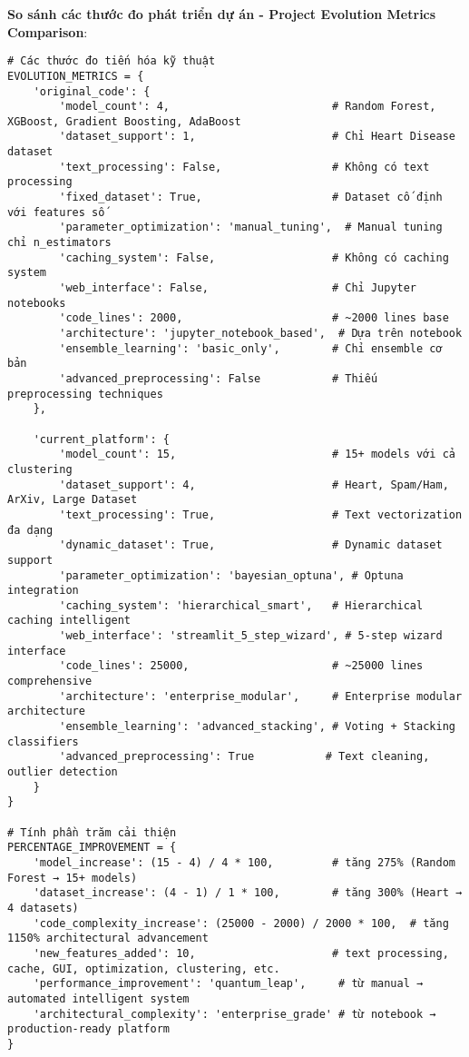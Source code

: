 \textbf{So sánh các thước đo phát triển dự án - Project Evolution Metrics Comparison}:

\begin{verbatim}
# Các thước đo tiến hóa kỹ thuật
EVOLUTION_METRICS = {
    'original_code': {
        'model_count': 4,                         # Random Forest, XGBoost, Gradient Boosting, AdaBoost
        'dataset_support': 1,                     # Chỉ Heart Disease dataset
        'text_processing': False,                 # Không có text processing
        'fixed_dataset': True,                    # Dataset cố định với features số
        'parameter_optimization': 'manual_tuning',  # Manual tuning chỉ n_estimators
        'caching_system': False,                  # Không có caching system
        'web_interface': False,                   # Chỉ Jupyter notebooks
        'code_lines': 2000,                       # ~2000 lines base
        'architecture': 'jupyter_notebook_based',  # Dựa trên notebook
        'ensemble_learning': 'basic_only',        # Chỉ ensemble cơ bản
        'advanced_preprocessing': False           # Thiếu preprocessing techniques
    },
    
    'current_platform': {
        'model_count': 15,                        # 15+ models với cả clustering
        'dataset_support': 4,                     # Heart, Spam/Ham, ArXiv, Large Dataset
        'text_processing': True,                  # Text vectorization đa dạng
        'dynamic_dataset': True,                  # Dynamic dataset support
        'parameter_optimization': 'bayesian_optuna', # Optuna integration
        'caching_system': 'hierarchical_smart',   # Hierarchical caching intelligent
        'web_interface': 'streamlit_5_step_wizard', # 5-step wizard interface
        'code_lines': 25000,                      # ~25000 lines comprehensive
        'architecture': 'enterprise_modular',     # Enterprise modular architecture
        'ensemble_learning': 'advanced_stacking', # Voting + Stacking classifiers  
        'advanced_preprocessing': True           # Text cleaning, outlier detection
    }
}

# Tính phần trăm cải thiện
PERCENTAGE_IMPROVEMENT = {
    'model_increase': (15 - 4) / 4 * 100,         # tăng 275% (Random Forest → 15+ models)
    'dataset_increase': (4 - 1) / 1 * 100,        # tăng 300% (Heart → 4 datasets)
    'code_complexity_increase': (25000 - 2000) / 2000 * 100,  # tăng 1150% architectural advancement
    'new_features_added': 10,                     # text processing, cache, GUI, optimization, clustering, etc.
    'performance_improvement': 'quantum_leap',     # từ manual → automated intelligent system
    'architectural_complexity': 'enterprise_grade' # từ notebook → production-ready platform
}
\end{verbatim}

